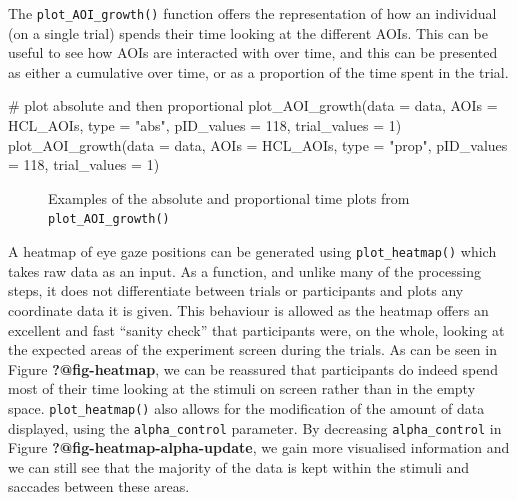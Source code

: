 \documentclass[
  man,
  floatsintext,
  longtable,
  nolmodern,
  notxfonts,
  notimes,
  colorlinks=true,linkcolor=blue,citecolor=blue,urlcolor=blue]{apa7}
\newenvironment{Shaded}{\begin{snugshade}}{\end{snugshade}}
\newcommand{\AttributeTok}[1]{\textcolor[rgb]{0.40,0.45,0.13}{#1}}
\newcommand{\CommentTok}[1]{\textcolor[rgb]{0.37,0.37,0.37}{#1}}
\newcommand{\DecValTok}[1]{\textcolor[rgb]{0.68,0.00,0.00}{#1}}
\newcommand{\FunctionTok}[1]{\textcolor[rgb]{0.28,0.35,0.67}{#1}}
\newcommand{\NormalTok}[1]{\textcolor[rgb]{0.00,0.23,0.31}{#1}}
\newcommand{\StringTok}[1]{\textcolor[rgb]{0.13,0.47,0.30}{#1}}
\begin{document}
The \texttt{plot\_AOI\_growth()} function offers the representation of
how an individual (on a single trial) spends their time looking at the
different AOIs. This can be useful to see how AOIs are interacted with
over time, and this can be presented as either a cumulative over time,
or as a proportion of the time spent in the trial.

\begin{Shaded}
\begin{Highlighting}[]
\CommentTok{\# plot absolute and then proportional}
\FunctionTok{plot\_AOI\_growth}\NormalTok{(}\AttributeTok{data =}\NormalTok{ data, }
                \AttributeTok{AOIs =}\NormalTok{ HCL\_AOIs, }
                \AttributeTok{type =} \StringTok{"abs"}\NormalTok{, }
                \AttributeTok{pID\_values =} \DecValTok{118}\NormalTok{,}
                \AttributeTok{trial\_values =} \DecValTok{1}\NormalTok{)}
\FunctionTok{plot\_AOI\_growth}\NormalTok{(}\AttributeTok{data =}\NormalTok{ data, }
                \AttributeTok{AOIs =}\NormalTok{ HCL\_AOIs, }
                \AttributeTok{type =} \StringTok{"prop"}\NormalTok{,  }
                \AttributeTok{pID\_values =} \DecValTok{118}\NormalTok{,}
                \AttributeTok{trial\_values =} \DecValTok{1}\NormalTok{)}
\end{Highlighting}
\end{Shaded}

\begin{figure}[H]

\caption{\label{fig-growth}Examples of the absolute and proportional
time plots from \texttt{plot\_AOI\_growth()}}

\end{figure}%

A heatmap of eye gaze positions can be generated using
\texttt{plot\_heatmap()} which takes raw data as an input. As a
function, and unlike many of the processing steps, it does not
differentiate between trials or participants and plots any coordinate
data it is given. This behaviour is allowed as the heatmap offers an
excellent and fast ``sanity check'' that participants were, on the
whole, looking at the expected areas of the experiment screen during the
trials. As can be seen in Figure \textbf{?@fig-heatmap}, we can be
reassured that participants do indeed spend most of their time looking
at the stimuli on screen rather than in the empty space.
\texttt{plot\_heatmap()} also allows for the modification of the amount
of data displayed, using the \texttt{alpha\_control} parameter. By
decreasing \texttt{alpha\_control} in Figure
\textbf{?@fig-heatmap-alpha-update}, we gain more visualised information
and we can still see that the majority of the data is kept within the
stimuli and saccades between these areas.
\end{document}
